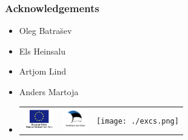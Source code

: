 \documentclass{beamer}
\begin{document}
\begin{frame}
\frametitle{Acknowledgements}
{\footnotesize
\begin{itemize}
\item Oleg Batra\u{s}ev
\item Els Heinsalu
\item Artjom Lind
\item Anders Martoja
\item \begin{minipage}{1.0\linewidth}
\begin{center}
\begin{tabular}{ccc}
  \includegraphics[height=0.950cm]{./EUrdf.png} &
  \includegraphics[height=0.950cm]{./EstoniaFlag.png} &
  \texttt{[image: ./excs.png]} 
\end{tabular}
\end{center}
\end{minipage}
\end{itemize}
}
\end{frame}
\end{document}
